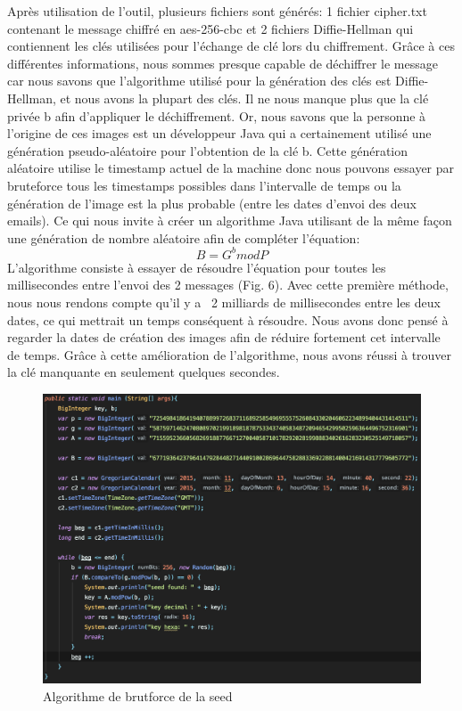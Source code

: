 \documentclass[12pt, oneside]{article}
\begin{document}
Après utilisation de l'outil, plusieurs fichiers sont générés: 1 fichier cipher.txt contenant le message chiffré en aes-256-cbc et 2 fichiers Diffie-Hellman qui contiennent les clés utilisées pour l'échange de clé lors du chiffrement. Grâce à ces différentes informations, nous sommes presque capable de déchiffrer le message car nous savons que l'algorithme utilisé pour la génération des clés est Diffie-Hellman, et nous avons la plupart des clés. Il ne nous manque plus que la clé privée b afin d'appliquer le déchiffrement. Or, nous savons que la personne à l'origine de ces images est un développeur Java qui a certainement utilisé une génération pseudo-aléatoire pour l'obtention de la clé b. Cette génération aléatoire utilise le timestamp actuel de la machine donc nous pouvons essayer par bruteforce tous les timestamps possibles dans l'intervalle de temps ou la génération de l'image est la plus probable (entre les dates d'envoi des deux emails). Ce qui nous invite à créer un algorithme Java utilisant de la même façon une génération de nombre aléatoire afin de compléter l'équation: 
\[ B = G^b mod P \]
L'algorithme consiste à essayer de résoudre l'équation pour toutes les millisecondes entre l'envoi des 2 messages (Fig. 6). 
Avec cette première méthode, nous nous rendons compte qu'il y a ~2 milliards de millisecondes entre les deux dates, ce qui mettrait un temps conséquent à résoudre. Nous avons donc pensé à regarder la dates de création des images afin de réduire fortement cet intervalle de temps. Grâce à cette amélioration de l'algorithme, nous avons réussi à trouver la clé manquante en seulement quelques secondes.

\begin{figure}[ht]
\centering
\includegraphics[scale=0.5]{code}
\caption{Algorithme de brutforce de la seed}
\end{figure}
\end{document}
